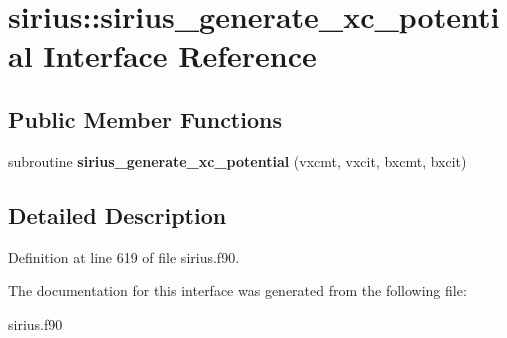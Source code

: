 \hypertarget{interfacesirius_1_1sirius__generate__xc__potential}{}\section{sirius\+:\+:sirius\+\_\+generate\+\_\+xc\+\_\+potential Interface Reference}
\label{interfacesirius_1_1sirius__generate__xc__potential}
\subsection*{Public Member Functions}
\begin{DoxyCompactItemize}
\item 
\hypertarget{interfacesirius_1_1sirius__generate__xc__potential_ac73144c1d2d0bf63a032bfa4cf6dee69}{}subroutine {\bfseries sirius\+\_\+generate\+\_\+xc\+\_\+potential} (vxcmt, vxcit, bxcmt, bxcit)\label{interfacesirius_1_1sirius__generate__xc__potential_ac73144c1d2d0bf63a032bfa4cf6dee69}

\end{DoxyCompactItemize}


\subsection{Detailed Description}


Definition at line 619 of file sirius.\+f90.



The documentation for this interface was generated from the following file\+:\begin{DoxyCompactItemize}
\item 
sirius.\+f90\end{DoxyCompactItemize}
